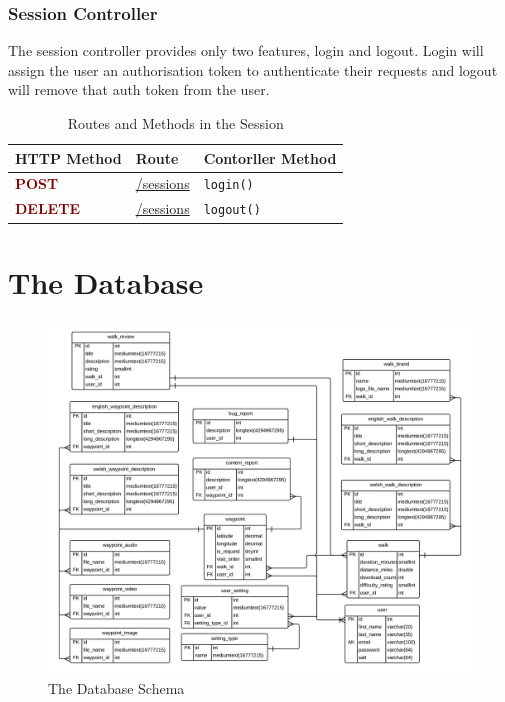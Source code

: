 \documentclass[11pt,a4paper]{report}
\begin{document}
\subsubsection{Session Controller}

The session controller provides only two features, login and logout. Login will assign the user an authorisation token to authenticate their requests and logout will remove that auth token from the user. 

\begin{table}[H]
\centering
\begin{tabular}{l | l | l}
HTTP Method & Route & Contorller Method\\ \hline
\textbf{\textcolor{Maroon}{POST}} & \url{/sessions} & \lstinline$login()$\\
\textbf{\textcolor{Maroon}{DELETE}} & \url{/sessions} & \lstinline$logout()$\\
\end{tabular}
\caption{Routes and Methods in the Session}
\label{tab:SessionController}
\end{table}
\section{The Database}
\label{sec:database-design}

\begin{figure}[H]
    \centering
    \includegraphics[width=\textwidth]{DatabaseSchema}
    \caption{The Database Schema}
    \label{fig:databaseschema}
\end{figure}
\end{document}
